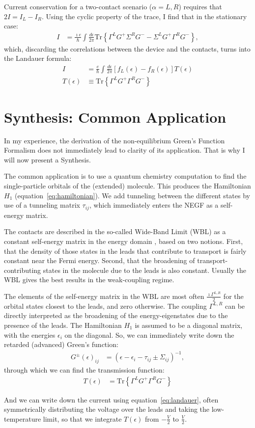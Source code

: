 Current conservation for a two-contact scenario ($\alpha=L,R$) requires that $2 I = I_L - I_R$. Using the cyclic property of the trace, I find that in the stationary case:
\begin{align*}
I &= \frac{\imath e}{\hbar} \int \frac{d\epsilon}{2\pi} \text{Tr}\left\{ \Gamma^L G^+ \Sigma^R G^- - \Sigma^L G^+ \Gamma^R G^-\right\},
\end{align*}
which, discarding the correlations between the device and the contacts, turns into the Landauer formula:
\begin{align}
I &= \frac{e}{\hbar} \int \frac{d\epsilon}{2\pi} \left[ f_L(\epsilon) - f_R(\epsilon)\right] T(\epsilon) \label{eq:landauer}\\
T(\epsilon)&\equiv \text{Tr}\left\{ \Gamma^L G^+ \Gamma^R G^-\right\}\nonumber
\end{align}

\section{Synthesis: Common Application}
\label{sec:synthesis}


In my experience, the derivation of the non-equilibrium Green's Function Formalism does not immediately lead to clarity of its application. That is why I will now present a Synthesis.

The common application is to use a quantum chemistry computation to find the single-particle orbitals of the (extended) molecule. This produces the Hamiltonian $H_1$ (equation~\ref{eq:hamiltonian}). We add tunneling between the different states by use of a tunneling matrix $\tau_{ij}$, which immediately enters the NEGF as a self-energy matrix. 

The contacts are described in the so-called Wide-Band Limit (WBL) as a constant self-energy matrix in the energy domain \cite{wbl}, based on two notions. First, that the density of those states in the leads that contribute to transport  is fairly constant near the Fermi energy. Second, that the broadening of transport-contributing states in the molecule due to the leads is also constant. Usually the WBL gives the best results in the weak-coupling regime.

The elements of the self-energy matrix in the WBL are most often $\frac{\imath \Gamma^{L,R}}{2}$ for the orbital states closest to the leads, and zero otherwise. The coupling $\Gamma^{L,R}$ can be directly interpreted as the broadening of the energy-eigenstates due to the presence of the leads. The Hamiltonian $H_1$ is assumed to be a diagonal matrix, with the energies $\epsilon_i$ on the diagonal. So, we can immediately write down the retarded (advanced) Green's function:
\begin{align}
G^\pm(\epsilon)_{ij} &= \left(\epsilon - \epsilon_i - \tau_{ij} \pm \Sigma_{ij}\right)^{-1}
\label{eq:commongf},
\end{align}
through which we can find the transmission function:
\begin{align}
T(\epsilon) &= \text{Tr}\left\{\Gamma^L G^+ \Gamma^R G^-\right\}
\label{eq:commonte}
\end{align}

And we can write down the current using equation~\ref{eq:landauer}, often symmetrically distributing the voltage over the leads and taking the low-temperature limit, so that we integrate $T(\epsilon)$ from $-\frac{V}{2}$ to $\frac{V}{2}$. 




